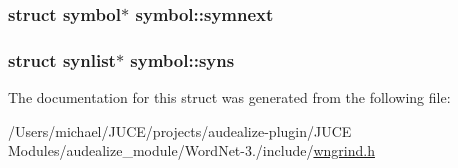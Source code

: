 \subsubsection[{\texorpdfstring{symnext}{symnext}}]{\setlength{\rightskip}{0pt plus 5cm}struct {\bf symbol}$\ast$ symbol\+::symnext}\hypertarget{structsymbol_a5720b8e7b0fbd499f1d001f04d39d67e}{}\label{structsymbol_a5720b8e7b0fbd499f1d001f04d39d67e}
\subsubsection[{\texorpdfstring{syns}{syns}}]{\setlength{\rightskip}{0pt plus 5cm}struct {\bf synlist}$\ast$ symbol\+::syns}\hypertarget{structsymbol_a2cd0744aa0880eab684564abef2ee29e}{}\label{structsymbol_a2cd0744aa0880eab684564abef2ee29e}


The documentation for this struct was generated from the following file\+:\begin{DoxyCompactItemize}
\item 
/\+Users/michael/\+J\+U\+C\+E/projects/audealize-\/plugin/\+J\+U\+C\+E Modules/audealize\+\_\+module/\+Word\+Net-\/3./include/\hyperlink{wngrind_8h}{wngrind.\+h}\end{DoxyCompactItemize}
